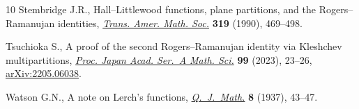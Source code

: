\documentclass[pdftex]{sigma}
\numberwithin{equation}{section}
\begin{document}
\begin{thebibliography}{10}
Stembridge J.R., {H}all--{L}ittlewood functions, plane partitions, and the
 {R}ogers--{R}amanujan identities, \href{https://doi.org/10.2307/2001250}{\textit{Trans. Amer. Math. Soc.}}
 \textbf{319} (1990), 469--498.

Tsuchioka S., A proof of the second {R}ogers--{R}amanujan identity via
 {K}leshchev multipartitions, \href{https://doi.org/10.3792/pjaa.99.005}{\textit{Proc. Japan Acad. Ser.~A Math. Sci.}}
 \textbf{99} (2023), 23--26, \href{https://arxiv.org/abs/2205.06038}{arXiv:2205.06038}.

Watson G.N., A note on Lerch's functions, \href{https://doi.org/10.1093/qmath/os-8.1.43}{\textit{Q.~J.~Math.}} \textbf{8}
 (1937), 43--47.

\end{thebibliography}\LastPageEnding
\end{document}
